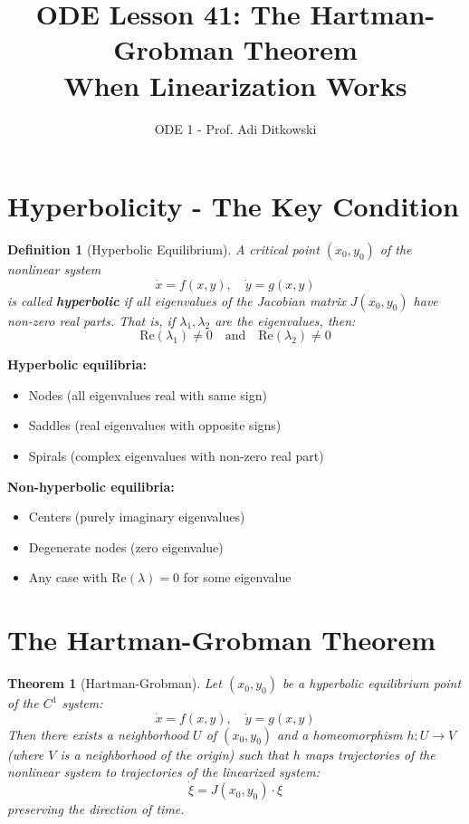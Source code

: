 \documentclass[12pt]{article}
\title{ODE Lesson 41: The Hartman-Grobman Theorem\\
\large When Linearization Works}
\author{ODE 1 - Prof. Adi Ditkowski}
\date{}
\newtheorem{definition}{Definition}
\newtheorem{theorem}{Theorem}
\begin{document}
\maketitle

\section{Hyperbolicity - The Key Condition}

\begin{definition}[Hyperbolic Equilibrium]
A critical point $(x_0, y_0)$ of the nonlinear system
$$\dot{x} = f(x,y), \quad \dot{y} = g(x,y)$$
is called \textbf{hyperbolic} if all eigenvalues of the Jacobian matrix $J(x_0, y_0)$ have non-zero real parts. That is, if $\lambda_1, \lambda_2$ are the eigenvalues, then:
$$\text{Re}(\lambda_1) \neq 0 \quad \text{and} \quad \text{Re}(\lambda_2) \neq 0$$
\end{definition}

\begin{keypoint}
\textbf{Hyperbolic equilibria:}
\begin{itemize}
    \item Nodes (all eigenvalues real with same sign)
    \item Saddles (real eigenvalues with opposite signs)
    \item Spirals (complex eigenvalues with non-zero real part)
\end{itemize}
\textbf{Non-hyperbolic equilibria:}
\begin{itemize}
    \item Centers (purely imaginary eigenvalues)
    \item Degenerate nodes (zero eigenvalue)
    \item Any case with $\text{Re}(\lambda) = 0$ for some eigenvalue
\end{itemize}
\end{keypoint}

\section{The Hartman-Grobman Theorem}

\begin{theorem}[Hartman-Grobman]
Let $(x_0, y_0)$ be a hyperbolic equilibrium point of the $C^1$ system:
$$\dot{x} = f(x,y), \quad \dot{y} = g(x,y)$$
Then there exists a neighborhood $U$ of $(x_0, y_0)$ and a homeomorphism $h: U \to V$ (where $V$ is a neighborhood of the origin) such that $h$ maps trajectories of the nonlinear system to trajectories of the linearized system:
$$\dot{\xi} = J(x_0, y_0) \cdot \xi$$
preserving the direction of time.
\end{theorem}
\end{document}
